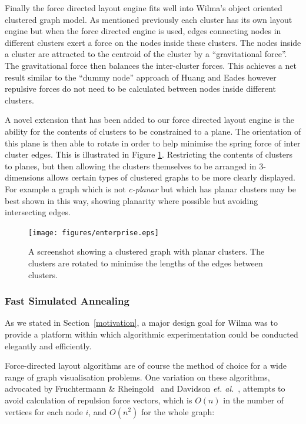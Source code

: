 \documentclass[runningheads]{cl2emult}
\begin{document}
Finally the force directed layout engine fits well into Wilma's object
oriented clustered graph model.  As mentioned previously each cluster
has its own layout engine but when the force directed engine is used,
edges connecting nodes in different clusters exert a force on
the nodes inside these clusters.  The nodes inside a cluster are
attracted to the centroid of the cluster by a ``gravitational force''.
The gravitational force then balances the inter-cluster forces.  This
achieves a net result similar to the ``dummy node'' approach of Huang
and Eades\cite{Huang:GD98} however repulsive forces do not need to be
calculated between nodes inside different clusters.

A novel extension that has been added to our force directed layout
engine is the ability for the contents of clusters to be constrained
to a plane.  The orientation of this plane is then able to rotate in
order to help minimise the spring force of inter cluster edges.  This
is illustrated in Figure \ref{fig-spincluster}.  Restricting the
contents of clusters to planes, but then allowing the clusters
themselves to be arranged in 3-dimensions allows certain types of
clustered
graphs to be more clearly displayed.  For example a graph which is not
{\em c-planar}\cite{Eades:GD96} but which has planar clusters may be best
shown in this way, showing planarity where possible but avoiding
intersecting edges.
\begin{figure}[h]
  \centering
    \texttt{[image: figures/enterprise.eps]}
  \caption{A screenshot showing a clustered graph with planar
  clusters.  The clusters are rotated to minimise the lengths of the
  edges between clusters.}
  \label{fig-spincluster}
\end{figure}

\subsubsection{Fast Simulated Annealing}

As we stated in Section~\ref{motivation}, a major design goal for Wilma
was to provide a platform within which algorithmic experimentation could be
conducted elegantly and efficiently.

Force-directed layout algorithms are of course the method of choice for a
wide range of graph visualisation problems.  One variation on these
algorithms, advocated by Fruchtermann \&
Rheingold~\cite{fruchtermann90force-directed} and Davidson {\em et.
al.}~\cite{davidson01noise}, attempts to avoid calculation of repulsion force
vectors, which is $O(n)$ in the number of vertices for each node $i$, and
$O(n^2)$ for the whole graph:
\end{document}
